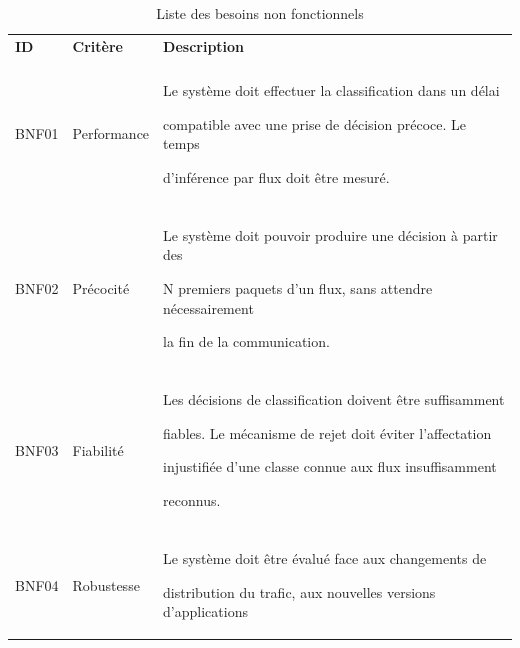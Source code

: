\begin{table}[H]

\centering

\caption{Liste des besoins non fonctionnels}

\label{tab:besoins-non-fonctionnels}

\small

\begin{tabularx}{\textwidth}{|p{1.4cm}|p{3.2cm}|Y|}

\hline

\textbf{ID} & \textbf{Critère} & \textbf{Description} \\\\

\hline



BNF01 & Performance &

Le système doit effectuer la classification dans un délai

compatible avec une prise de décision précoce. Le temps

d'inférence par flux doit être mesuré. \\\\

\hline



BNF02 & Précocité &

Le système doit pouvoir produire une décision à partir des

N premiers paquets d'un flux, sans attendre nécessairement

la fin de la communication. \\\\

\hline



BNF03 & Fiabilité &

Les décisions de classification doivent être suffisamment

fiables. Le mécanisme de rejet doit éviter l'affectation

injustifiée d'une classe connue aux flux insuffisamment

reconnus. \\\\

\hline



BNF04 & Robustesse &

Le système doit être évalué face aux changements de

distribution du trafic, aux nouvelles versions d'applications


\end{tabularx}
\end{table}
